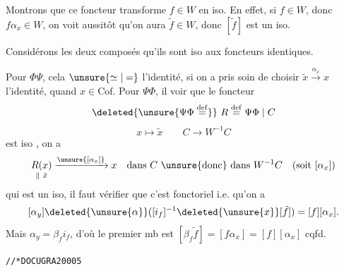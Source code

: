  Montrons que ce foncteur transforme $f\in W$ en iso.
En effet, si $f\in W$, donc $f\alpha_x\in W$, on voit aussitôt qu'on aura $\tilde f\in W$, donc $[\tilde f]$ est un iso.

Considérons les deux composés
  qu'ils  sont  iso aux foncteurs identiques.

Pour $\Phi\Psi$, cela $\unsure{\simeq|=}$ l'identité, si on a pris soin de choisir $\tilde x\xrightarrow{\alpha_x}x$ l'identité, quand $x\in\mathrm{Cof}$.
Pour $\Psi\Phi$, il   voir que le foncteur
\[
\deleted{\unsure{\Psi\Phi\overset{\mathrm{def}}{=}}}\ R\overset{\mathrm{def}}{=}\Psi\Phi\mid C
\]
\[
x\longmapsto\tilde x\qquad C\longrightarrow W^{-1}C
\]
est iso  , on a
\[
\underset{\parallel\ \tilde x}{R(x)}\xrightarrow{\unsure{[\alpha_x]}}x\quad\text{dans }C\ \unsure{\text{donc}}\ \text{dans }W^{-1}C\quad(\text{soit }[\alpha_x])
\]
qui est un iso, il faut vérifier que c'est fonctoriel
i.e. qu'on a
\[
[\alpha_y]\deleted{\unsure{\alpha}}([i_f]^{-1}\deleted{\unsure{x}}[\tilde f])=[f][\alpha_x].
\]
Mais $\alpha_y=\beta_f i_f$, d'où le premier mb est $[\beta_f\tilde f]=[f\alpha_x]=[f][\alpha_x]$ cqfd.

\texttt{//*\quad DOCUGRA20005}\qquad{}

